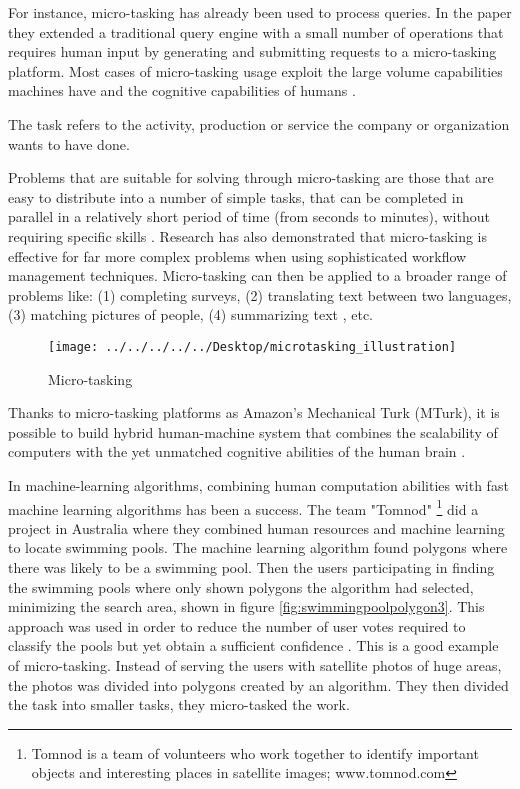 For instance, micro-tasking has already been used to process queries. In the \cite{Franklin2011} paper they extended a traditional query engine with a small number of operations that requires human input by generating and submitting requests to a micro-tasking platform. Most cases of micro-tasking usage exploit the large volume capabilities machines have and the cognitive capabilities of humans \citep{Difallah2016}.  

The task refers to the activity, production or service the company or organization wants to have done.

Problems that are suitable for solving through micro-tasking are those that are easy to distribute into a number of simple tasks, that can be completed in parallel in a relatively short period of time (from seconds to minutes), without requiring specific skills \citep{Sarasua2012}. Research has also demonstrated that micro-tasking is effective for far more complex problems when using sophisticated workflow management techniques. Micro-tasking can then be applied to a broader range of problems like: (1) completing surveys, (2) translating text between two languages, (3) matching pictures of people, (4) summarizing text \citep{Bernstein2015a}, etc. 

\begin{figure}[H]
	\centering
	\texttt{[image: ../../../../../Desktop/microtasking\_illustration]}
	\caption{Micro-tasking \citep{Michelucci2015}}
	\label{fig:microtaskingillustration}
\end{figure}

Thanks to micro-tasking platforms as Amazon's Mechanical Turk (MTurk), it is possible to build hybrid human-machine system that combines the scalability of computers with the yet unmatched cognitive abilities of the human brain \citep{Difallah2016}.

In machine-learning algorithms, combining human computation abilities with fast machine learning algorithms has been a success. The team "Tomnod" \footnote{Tomnod is a team of volunteers who work together to identify important objects and interesting places in satellite images; www.tomnod.com} did a project in Australia where they combined human resources and machine learning to locate swimming pools. The machine learning algorithm found polygons where there was likely to be a swimming pool. Then the users participating in finding the swimming pools where only shown polygons the algorithm had selected, minimizing the search area, shown in figure \ref{fig:swimmingpoolpolygon3}. This approach was used in order to reduce the number of user votes required to classify the pools but yet obtain a sufficient confidence \citep{Kostas2016}. This is a good example of micro-tasking. Instead of serving the users with satellite photos of huge areas, the photos was divided into polygons created by an algorithm. They then divided the task into smaller tasks, they micro-tasked the work. 


